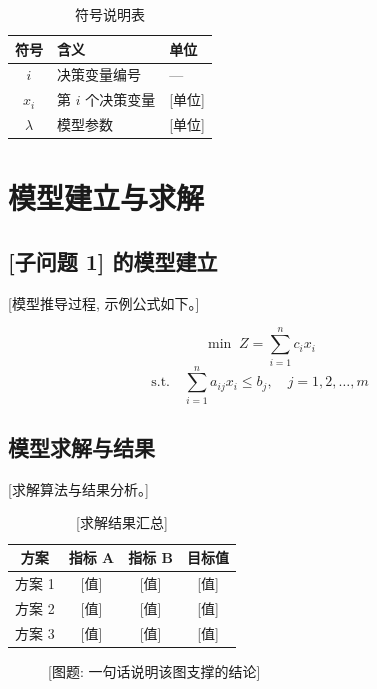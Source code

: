 \documentclass[zihao=-4,a4paper]{ctexart}
\begin{document}
\begin{table}[H]
  \centering
  \caption{符号说明表}
  \begin{tabular}{cll}
    \toprule
    符号 & 含义 & 单位 \\
    \midrule
    $i$   & 决策变量编号 & --- \\
    $x_i$ & 第 $i$ 个决策变量 & [单位] \\
    $\lambda$ & 模型参数 & [单位] \\
    \bottomrule
  \end{tabular}
\end{table}

\section{模型建立与求解}

\subsection{[子问题 1] 的模型建立}

[模型推导过程, 示例公式如下。]

\begin{equation}
  \min \; Z = \sum_{i=1}^{n} c_i x_i
\end{equation}
\begin{equation}
  \text{s.t.}\quad \sum_{i=1}^{n} a_{ij} x_i \le b_j, \quad j = 1,2,\dots,m
\end{equation}

\subsection{模型求解与结果}

[求解算法与结果分析。]

\begin{table}[H]
  \centering
  \caption{[求解结果汇总]}
  \begin{tabular}{cccc}
    \toprule
    方案 & 指标 A & 指标 B & 目标值 \\
    \midrule
    方案 1 & [值] & [值] & [值] \\
    方案 2 & [值] & [值] & [值] \\
    方案 3 & [值] & [值] & [值] \\
    \bottomrule
  \end{tabular}
\end{table}

\begin{figure}[H]
  \centering
  \caption{[图题: 一句话说明该图支撑的结论]}
\end{figure}
\end{document}
